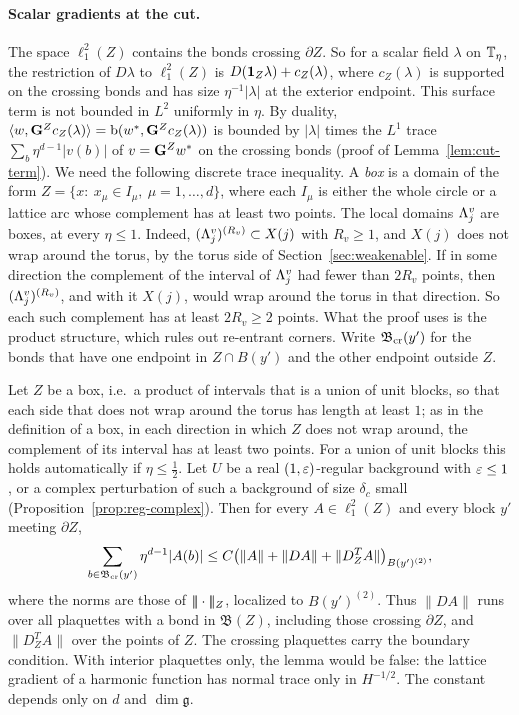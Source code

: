 \paragraph{Scalar gradients at the cut.} The space $\ell^2_1(Z)$ contains the bonds crossing $\partial Z$. So for a scalar field $\lambda$ on $\mathbb T_\eta$, the restriction of $D\lambda$ to $\ell^2_1(Z)$ is $D(\mathbf 1_Z\lambda)+c_Z(\lambda)$, where $c_Z(\lambda)$ is supported on the crossing bonds and has size $\eta^{-1}|\lambda|$ at the exterior endpoint. This surface term is not bounded in $L^2$ uniformly in $\eta$. By duality, $\langle w,\mathbf G^Zc_Z(\lambda)\rangle=\mathrm b(w^*,\mathbf G^Zc_Z(\lambda))$ is bounded by $|\lambda|$ times the $L^1$ trace $\sum_b\eta^{d-1}|v(b)|$ of $v=\mathbf G^Zw^*$ on the crossing bonds (proof of Lemma~\ref{lem:cut-term}). We need the following discrete trace inequality. A \emph{box} is a domain of the form $Z=\{x:\ x_\mu\in I_\mu,\ \mu=1,\dots,d\}$, where each $I_\mu$ is either the whole circle or a lattice arc whose complement has at least two points. The local domains $\Lambda^v_j$ are boxes, at every $\eta\le1$. Indeed, $(\Lambda^v_j)^{(R_v)}\subset X(j)$ with $R_v\ge1$, and $X(j)$ does not wrap around the torus, by the torus side of Section~\ref{sec:weakenable}. If in some direction the complement of the interval of $\Lambda^v_j$ had fewer than $2R_v$ points, then $(\Lambda^v_j)^{(R_v)}$, and with it $X(j)$, would wrap around the torus in that direction. So each such complement has at least $2R_v\ge2$ points. What the proof uses is the product structure, which rules out re-entrant corners. Write $\mathfrak B_{\rm cr}(y')$ for the bonds that have one endpoint in $Z\cap B(y')$ and the other endpoint outside $Z$.

\begin{lemma}\label{lem:trace}
Let $Z$ be a box, i.e.\ a product of intervals that is a union of unit blocks, so that each side that does not wrap around the torus has length at least $1$; as in the definition of a box, in each direction in which $Z$ does not wrap around, the complement of its interval has at least two points. For a union of unit blocks this holds automatically if $\eta\le\frac12$. Let $U$ be a real $(1,\varepsilon)$-regular background with $\varepsilon\le1$, or a complex perturbation of such a background of size $\delta_c$ small (Proposition~\ref{prop:reg-complex}). Then for every $A\in\ell^2_1(Z)$ and every block $y'$ meeting $\partial Z$,
\[
\sum_{b\in\mathfrak B_{\rm cr}(y')}\eta^{d-1}|A(b)|\le C\big(\|A\|+\|DA\|+\|D^T_ZA\|\big)_{B(y')^{(2)}},
\]
where the norms are those of $|\!|\!|\cdot|\!|\!|_Z$, localized to $B(y')^{(2)}$. Thus $\|DA\|$ runs over all plaquettes with a bond in $\mathfrak B(Z)$, including those crossing $\partial Z$, and $\|D^T_ZA\|$ over the points of $Z$. The crossing plaquettes carry the boundary condition. With interior plaquettes only, the lemma would be false: the lattice gradient of a harmonic function has normal trace only in $H^{-1/2}$. The constant depends only on $d$ and $\dim\mathfrak g$.
\end{lemma}

